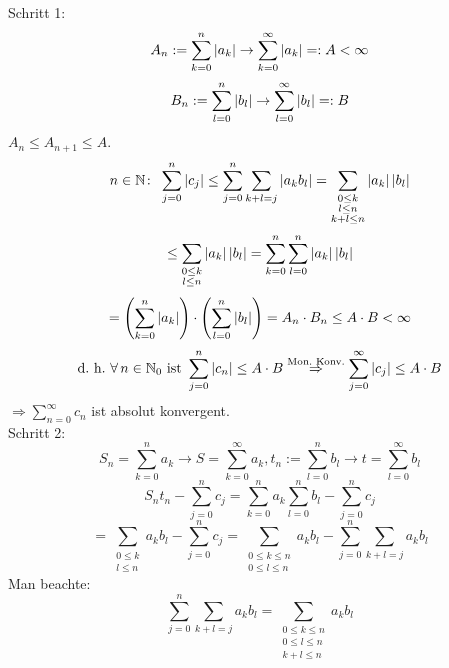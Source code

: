 \documentclass[../ana1.tex]{subfiles}
\begin{document}
\begin{prosa}
    \begin{center}
    \end{center}
\end{prosa}
\begin{bew}
    Schritt 1: 
    \[ A_n := \sum_{k=0}^n \left|a_k\right| \rightarrow \sum_{k=0}^\infty \left|a_k\right| =: A < \infty \]
    \[ B_n := \sum_{l=0}^n \left|b_l\right| \rightarrow \sum_{l=0}^\infty|b_l| =: B \]
    \( A_n \leq A_{n+1} \leq A \).
    \[ n\in\mathbb{N} \colon \; \sum_{j=0}^n \left|c_j\right| \leq \sum_{j=0}^n \sum_{k+l=j} \left|a_k b_l\right| = \sum_{\substack{0\leq k \\ l\leq n \\ k+l\leq n}} \left|a_k\right|\left|b_l\right| \]
    \[ \leq \sum_{\substack{0\leq k \\ l\leq n}} \left|a_k\right| \left|b_l\right| = \sum_{k=0}^n \sum_{l=0}^n \left|a_k\right| \left|b_l\right| \]
    \[ = \left( \sum_{k=0}^n \left|a_k\right| \right) \cdot \left( \sum_{l=0}^n \left|b_l\right| \right) = A_n \cdot B_n \leq A \cdot B < \infty \]
    \[ \text{d.\ h.\ } \forall \, n\in\N_0 \text{ ist } \sum_{j=0}^n \abs{c_n} \leq A \cdot B \overset{\text{Mon.\ Konv.}}{\Rightarrow} \sum_{j=0}^\infty \abs{c_j} \leq A \cdot B \]
    \( \Rightarrow \sum_{n=0}^\infty c_n \) ist absolut konvergent. \\
    Schritt 2:
    \[ S_n = \sum_{k=0}^n a_k \rightarrow S = \sum_{k=0}^\infty a_k, t_n := \sum_{l=0}^n b_l \rightarrow t = \sum_{l=0}^\infty b_l \]
    \[ S_n t_n - \sum_{j=0}^n c_j = \sum_{k=0}^n a_k \sum_{l=0}^n b_l - \sum_{j=0}^n c_j \]
    \[ = \sum_{\substack{0\leq k \\ l\leq n}} a_k b_l - \sum_{j=0}^n c_j = \sum_{\substack{0\leq k \leq n \\ 0\leq l \leq n}} a_k b_l - \sum_{j=0}^n \sum_{k+l=j} a_k b_l\]
    Man beachte:
    \[\sum_{j=0}^n \sum_{k+l=j} a_k b_l = \sum_{\substack{0\leq k \leq n \\ 0\leq l \leq n \\ k+l\leq n}} a_k b_l\]

\end{bew}
\end{document}
